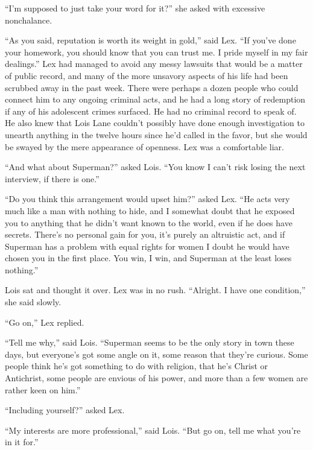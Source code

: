 \documentclass[ebook,12pt]{memoir}
\begin{document}
``I'm supposed to just take your word for it?'' she asked with excessive
nonchalance.

``As you said, reputation is worth its weight in gold,'' said Lex. ``If
you've done your homework, you should know that you can trust me. I
pride myself in my fair dealings.'' Lex had managed to avoid any messy
lawsuits that would be a matter of public record, and many of the more
unsavory aspects of his life had been scrubbed away in the past week.
There were perhaps a dozen people who could connect him to any ongoing
criminal acts, and he had a long story of redemption if any of his
adolescent crimes surfaced. He had no criminal record to speak of. He
also knew that Lois Lane couldn't possibly have done enough
investigation to unearth anything in the twelve hours since he'd called
in the favor, but she would be swayed by the mere appearance of
openness. Lex was a comfortable liar.

``And what about Superman?'' asked Lois. ``You know I can't risk losing
the next interview, if there is one.''

``Do you think this arrangement would upset him?'' asked Lex. ``He acts
very much like a man with nothing to hide, and I somewhat doubt that he
exposed you to anything that he didn't want known to the world, even if
he does have secrets. There's no personal gain for you, it's purely an
altruistic act, and if Superman has a problem with equal rights for
women I doubt he would have chosen you in the first place. You win, I
win, and Superman at the least loses nothing.''

Lois sat and thought it over. Lex was in no rush. ``Alright. I have one
condition,'' she said slowly.

``Go on,'' Lex replied.

``Tell me why,'' said Lois. ``Superman seems to be the only story in
town these days, but everyone's got some angle on it, some reason that
they're curious. Some people think he's got something to do with
religion, that he's Christ or Antichrist, some people are envious of his
power, and more than a few women are rather keen on him.''

``Including yourself?'' asked Lex.

``My interests are more professional,'' said Lois. ``But go on, tell me
what you're in it for.''
\end{document}
